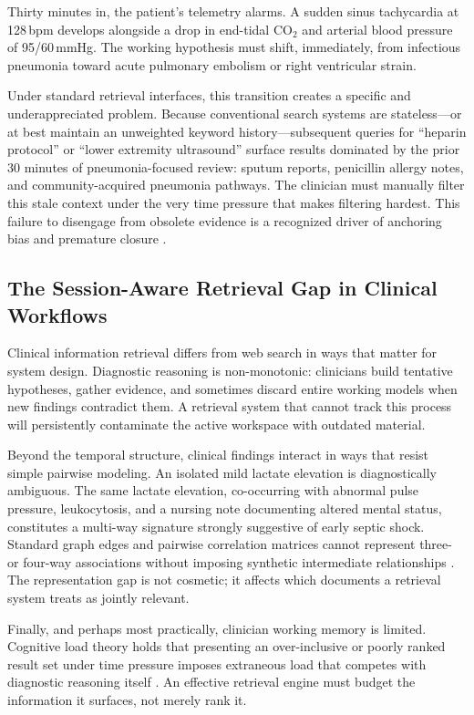 \documentclass[10pt, onecolumn]{article}
\begin{document}
Thirty minutes in, the patient's telemetry alarms. A sudden sinus tachycardia at 128\,bpm develops alongside a drop in end-tidal $\text{CO}_2$ and arterial blood pressure of 95/60\,mmHg. The working hypothesis must shift, immediately, from infectious pneumonia toward acute pulmonary embolism or right ventricular strain.

Under standard retrieval interfaces, this transition creates a specific and underappreciated problem. Because conventional search systems are stateless---or at best maintain an unweighted keyword history---subsequent queries for ``heparin protocol'' or ``lower extremity ultrasound'' surface results dominated by the prior 30 minutes of pneumonia-focused review: sputum reports, penicillin allergy notes, and community-acquired pneumonia pathways. The clinician must manually filter this stale context under the very time pressure that makes filtering hardest. This failure to disengage from obsolete evidence is a recognized driver of anchoring bias and premature closure \cite{croskerry2002achieving,goddard2012automation}.

\subsection{The Session-Aware Retrieval Gap in Clinical Workflows}

Clinical information retrieval differs from web search in ways that matter for system design. Diagnostic reasoning is non-monotonic: clinicians build tentative hypotheses, gather evidence, and sometimes discard entire working models when new findings contradict them. A retrieval system that cannot track this process will persistently contaminate the active workspace with outdated material.

Beyond the temporal structure, clinical findings interact in ways that resist simple pairwise modeling. An isolated mild lactate elevation is diagnostically ambiguous. The same lactate elevation, co-occurring with abnormal pulse pressure, leukocytosis, and a nursing note documenting altered mental status, constitutes a multi-way signature strongly suggestive of early septic shock. Standard graph edges and pairwise correlation matrices cannot represent three- or four-way associations without imposing synthetic intermediate relationships \cite{feng2019hypergraph,zhou2006learning}. The representation gap is not cosmetic; it affects which documents a retrieval system treats as jointly relevant.

Finally, and perhaps most practically, clinician working memory is limited. Cognitive load theory holds that presenting an over-inclusive or poorly ranked result set under time pressure imposes extraneous load that competes with diagnostic reasoning itself \cite{sweller1988cognitive,miller1956magical}. An effective retrieval engine must budget the information it surfaces, not merely rank it.
\end{document}
